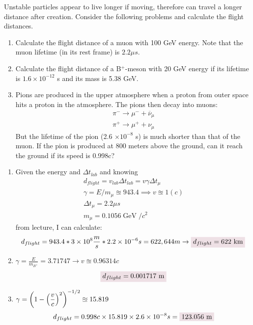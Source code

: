 \documentclass{article}
\DeclareMathOperator{\GeV}{GeV}
\begin{document}
\newpage
\begin{problem}
    Unstable particles appear to live longer if moving, therefore can travel a longer distance after creation. Consider the following problems and calculate the flight distances. 
    \begin{enumerate}[label=\alph*.]
        \item Calculate the flight distance of a muon with 100 GeV energy. Note that the muon lifetime (in its rest frame) is $2.2 \mu s$. 
        \item Calculate the flight distance of a B$^{+}$-meson with 20 GeV energy if its lifetime is $1.6\times10^{-12}$ s and its mass is 5.38 GeV. 
        \item Pions are produced in the upper atmosphere when a proton from outer space hits a proton in the atmosphere. The pions then decay into muons:
        \begin{gather*} 
            \pi^{-}\rightarrow \mu^{-}+\overline{\nu}_\mu
            \\
            \pi^{+}\rightarrow \mu^{+}+\nu_\mu
        \end{gather*}
        But the lifetime of the pion (2.6 $\times10^{-8}$ s) is much shorter than that of the muon. If the pion is produced at 800 meters above the ground, can it reach the ground if its speed is 0.998c?
    \end{enumerate}
    \answerline
    \begin{enumerate}[label=\alph*.]
        \item Given the energy and $\Delta t_{lab}$ and knowing 
        \begin{gather*}
            d_{flight}=v_{lab}\Delta t_{lab}=\boxed{v\gamma\Delta t_{\mu}}
            \\
            \gamma=E/m_\mu\approxeq 943.4\implies v\approxeq1(c)
            \\
            \Delta t_\mu=2.2\mu s
            \\
            m_\mu=0.1056\GeV/c^2
        \end{gather*} 
        from lecture, I can calculate:
        \begin{equation*}
            d_{flight}=943.4*3\times10^{8}\frac{m}{s}*2.2\times10^{-6}s=622,644m
            \rightarrow
            \coloredanswer{d_{flight}=622~\text{km}}
        \end{equation*}
        \item $\gamma=\frac{E}{m_{B^+}}=3.71747\rightarrow v\approxeq0.96314c$
        \begin{equation*}
            \coloredanswer{d_{flight}=0.001717~\text{m}}
        \end{equation*}
        \item $\displaystyle\gamma=\qty(1-\qty(\frac{v}{c})^2)^{-1/2}\approxeq 15.819$
        \begin{equation*}
            d_{flight}=0.998c\times15.819\times2.6\times10^{-8}s=\coloredanswer{123.056~\text{m}}
        \end{equation*}
    \end{enumerate}
\end{problem}
\end{document}
